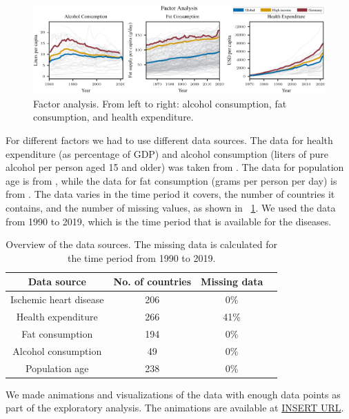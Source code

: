 \begin{figure}[ht]
    \vskip 0.2in
    \centering
    \centerline{\includegraphics[]{fig/fig_factor_analysis.pdf}}
    \caption{Factor analysis. From left to right: alcohol consumption, fat consumption, and health expenditure. }
    \label{Factor analysis}
\end{figure}
For different factors we had to use different data sources.
The data for health expenditure (as percentage of GDP) and alcohol consumption (liters of pure alcohol per person aged 15 and older) was taken from \citet{oecd}. 
The data for population age is from \citet{age}, while the data for fat consumption (grams per person per day) is from \citet{fat_consumption}. The data varies in the time period it covers,
the number of countries it contains, and the number of missing values, as shown in \tablename~\ref{Data overview}. We used the data from 1990 to 2019, which is the time period
that is available for the diseases.

\begin{table}[h]
    \centering
    \caption{Overview of the data sources. The missing data is calculated for the time period from 1990 to 2019.}
    \label{Data overview}
    \begin{tabular}{|c|c|c|c|}
    \hline
    Data source & No. of countries & Missing data\\
    \hline
    Ischemic heart disease & 206 & 0\%\\
    Health expenditure & 266 & 41\%\\
    Fat consumption & 194 & 0\%\\
    Alcohol consumption & 49 & 0\%\\
    Population age & 238 & 0\%\\
    \hline
    \end{tabular}
\end{table}



We made animations and visualizations of the data with enough data points as part of the exploratory analysis. The animations are available at \url{INSERT URL}. 

